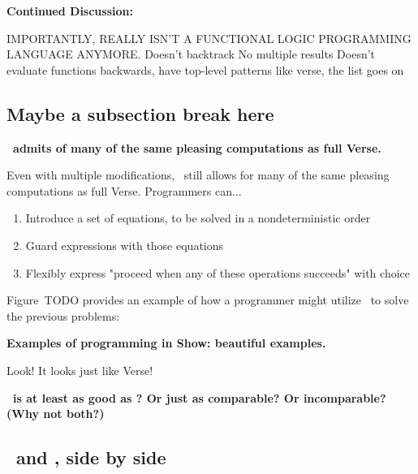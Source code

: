 \documentclass[manuscript,screen,review, 12pt]{acmart}
\begin{document}
\begin{outline}[enumerate]
    \1 \bf{Continued Discussion:}

    \2 IMPORTANTLY, \VMinus REALLY ISN'T A FUNCTIONAL LOGIC PROGRAMMING LANGUAGE ANYMORE. 
    \3 Doesn't backtrack
    \3 No multiple results 
    \3 Doesn't evaluate functions backwards, have top-level patterns like verse, the list goes on 



    \subsection{Maybe a subsection break here}
    
    \2 \bf{\VMinus\ admits of many of the same pleasing computations as full Verse. }
    
    Even with multiple modifications, \VMinus\ still allows for many of the same
    pleasing computations as full Verse. Programmers can... 
        \begin{enumerate}
            \item Introduce a set of equations, to be solved in a nondeterministic order 
            \item Guard expressions with those equations 
            \item Flexibly express "proceed when any of these operations succeeds" with choice 
        \end{enumerate}

    Figure~TODO provides an example of how a programmer might utilize
    \VMinus\ to solve the previous problems:

    
    \2 \bf{Examples of programming in \VMinus }
    \3 \bf{Show: beautiful examples. }
    
    Look! It looks just like Verse! 
   
    \2 \bf{\VMinus\ is at least as good as \PPlus? Or just as comparable? }
        Or incomparable? (Why not both?)
    
    \subsection{\VMinus\ and \PPlus, side by side}


\end{outline}
\end{document}
